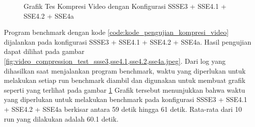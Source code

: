 \begin{figure}
    \centering
    \caption{Grafik Tes Kompresi Video dengan Konfigurasi SSSE3 + SSE4.1 + SSE4.2 + SSE4a}
    \label{fig:video_compression_test_ssse3,sse4.1,sse4.2,sse4a_graph}
\end{figure}

Program benchmark dengan kode \ref{code:kode_pengujian_kompresi_video} dijalankan pada konfigurasi SSSE3 + SSE4.1 + SSE4.2 + SSE4a. Hasil pengujian dapat dilihat pada gambar \ref{fig:video_compression_test_ssse3,sse4.1,sse4.2,sse4a.jpeg}. Dari log yang dihasilkan saat menjalankan program benchmark, waktu yang diperlukan untuk melakukan setiap run benchmark diambil dan digunakan untuk membuat grafik seperti yang terlihat pada gambar \ref{fig:video_compression_test_ssse3,sse4.1,sse4.2,sse4a_graph} Grafik tersebut menunjukkan bahwa waktu yang diperlukan untuk melakukan benchmark pada konfigurasi SSSE3 + SSE4.1 + SSE4.2 + SSE4a berkisar antara 59 detik hingga 61 detik. Rata-rata dari 10 run yang dilakukan adalah 60.1 detik.

